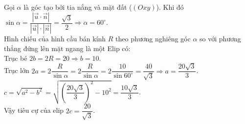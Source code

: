 \begin{ex}
{\begin{center}
	\end{center} 
	Gọi $\alpha$ là góc tạo bởi tia nắng và mặt đất ($(Oxy)$). Khi đó $\sin \alpha = \dfrac{|\vec{u} \cdot \vec{n}|}{|\vec{u}| \cdot |\vec{n}|} = \dfrac{\sqrt{3}}{2} \Rightarrow \alpha = 60^\circ$.\\
	Hình chiếu của hình cầu bán kính $R$ theo phương nghiêng góc $\alpha$ so với phương thẳng đứng lên mặt ngang là một Elip có:\\
	Trục bé $2b = 2R = 20 \Rightarrow b = 10$.\\
	Trục lớn $2a = 2\dfrac{R}{\sin \alpha} = 2\dfrac{R}{\sin \alpha} = 2\dfrac{10}{\sin 60^\circ} = \dfrac{40}{\sqrt{3}} \Rightarrow a =\dfrac{20\sqrt{3}}{3}$.\\
	$c = \sqrt{a^2 - b^2} = \sqrt{\left(\dfrac{20\sqrt{3}}{3}\right)^2 - 10^2} = \dfrac{10\sqrt{3}}{3}$.\\
	Vậy tiêu cự của elip $2c = \dfrac{20}{\sqrt{3}}$.
	}
\end{ex}

